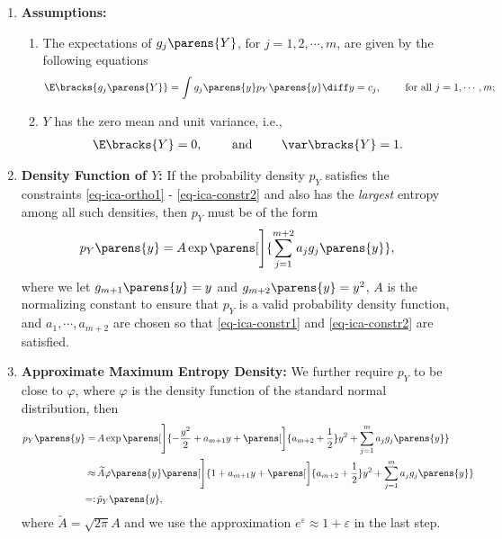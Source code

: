 \documentclass[12pt]{article}
\begin{document}
\begin{enumerate}[label=\textbf{\arabic*.}]
	\item \textbf{Assumptions:} 
	\begin{enumerate}
		\item The expectations of $g_j \parens{Y}$, for $j = 1, 2, \cdots, m$, are given by the following equations 
		\begin{align}\label{eq-ica-constr1}
			\E \bracks{g_j \parens{Y}} = \int g_j \parens{y} p_Y \parens{y} \diff y = c_j, \qquad \text{ for all } j = 1, \cdots, m; 
		\end{align}
		\item $Y$ has the zero mean and unit variance, i.e., 
		\begin{align}\label{eq-ica-constr2}
			\E \bracks{Y} = 0, \qquad \text{ and } \qquad \var \bracks{Y} = 1. 
		\end{align}
	\end{enumerate}
	
	\item \textbf{Density Function of $Y$:} If the probability density $p_Y$ satisfies the constraints \eqref{eq-ica-ortho1} - \eqref{eq-ica-constr2} and also has the \emph{largest} entropy among all such densities, then $p_Y$ must be of the form 
	\begin{align}
		p_Y \parens{y} = A \exp \parens[\Bigg]{\sum_{j=1}^{m+2} a_j g_j \parens{y}}, 
	\end{align}
	where we let $g_{m+1} \parens{y} = y$ and $g_{m+2} \parens{y} = y^2$, $A$ is the normalizing constant to ensure that $p_Y$ is a valid probability density function, and $a_1, \cdots, a_{m+2}$ are chosen so that \eqref{eq-ica-constr1} and \eqref{eq-ica-constr2} are satisfied. 
	
	\item \textbf{Approximate Maximum Entropy Density:} We further require $p_Y$ to be close to $\varphi$, where $\varphi$ is the density function of the standard normal distribution, then 
	\begin{align*}
		p_Y \parens{y} = & \, A \exp \parens[\Bigg]{-\frac{y^2}{2} + a_{m+1} y + \parens[\bigg]{a_{m+2} + \frac{1}{2}} y^2 + \sum_{j=1}^m a_j g_j \parens{y}} \\ 
		\approx & \, \widetilde{A} \varphi \parens{y} \parens[\Bigg]{ 1 + a_{m+1} y + \parens[\bigg]{a_{m+2} + \frac{1}{2}} y^2 + \sum_{j=1}^m a_j g_j \parens{y}} \\ 
		=: & \, \tilde{p}_Y \parens{y}, 
	\end{align*}
	where $\widetilde{A} = \sqrt{2 \pi} A$ and we use the approximation $e^{\varepsilon} \approx 1 + \varepsilon$ in the last step. 
	

\end{enumerate}
\end{document}
